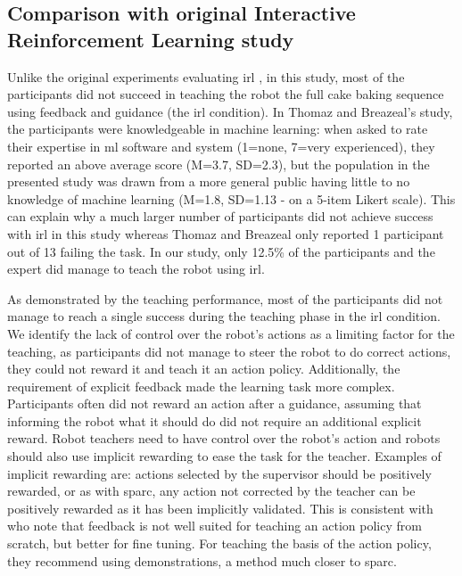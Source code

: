 \subsection{Comparison with original Interactive Reinforcement Learning study}


Unlike the original experiments evaluating \gls{irl} \citep{thomaz2008teachable}, in this study, most of the participants did not succeed in teaching the robot the full cake baking sequence using feedback and guidance (the \gls{irl} condition). In Thomaz and Breazeal's study, the participants were knowledgeable in machine learning: when asked to rate their expertise in \gls{ml} software and system (1=none, 7=very experienced), they reported an above average score (M=3.7, SD=2.3), but the population in the presented study was drawn from a more general public having little to no knowledge of machine learning (M=1.8, SD=1.13 - on a 5-item Likert scale). This can explain why a much larger number of participants did not achieve success with \gls{irl} in this study whereas Thomaz and Breazeal only reported 1 participant out of 13 failing the task. In our study, only 12.5\% of the participants and the expert did manage to teach the robot using \gls{irl}. 

As demonstrated by the teaching performance, most of the participants did not manage to reach a single success during the teaching phase in the \gls{irl} condition. We identify the lack of control over the robot's actions as a limiting factor for the teaching, as participants did not manage to steer the robot to do correct actions, they could not reward it and teach it an action policy. Additionally, the requirement of explicit feedback made the learning task more complex. Participants often did not reward an action after a guidance, assuming that informing the robot what it should do did not require an additional explicit reward. Robot teachers need to have control over the robot's action and robots should also use implicit rewarding to ease the task for the teacher. Examples of implicit rewarding are: actions selected by the supervisor should be positively rewarded, or as with \gls{sparc}, any action not corrected by the teacher can be positively rewarded as it has been implicitly validated. This is consistent with \cite{kaochar2011towards} who note that feedback is not well suited for teaching an action policy from scratch, but better for fine tuning. For teaching the basis of the action policy, they recommend using demonstrations, a method much closer to \gls{sparc}. 

